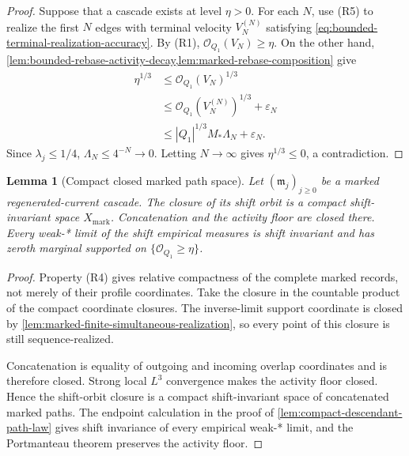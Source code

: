 \documentclass[11pt]{amsart}
\numberwithin{equation}{section}
\theoremstyle{plain}
\newtheorem{lemma}[lemma]{Lemma}
\theoremstyle{definition}
\theoremstyle{remark}
\begin{document}
\begin{proof}
Suppose that a cascade exists at level \(\eta>0\).  For each \(N\), use
\textup{(R5)} to realize the first \(N\) edges with terminal velocity
\(V_N^{(N)}\) satisfying
\eqref{eq:bounded-terminal-realization-accuracy}.
By \textup{(R1)},
\(\mathcal O_{Q_1}(V_N)\ge\eta\).  On the other hand,
\cref{lem:bounded-rebase-activity-decay,lem:marked-rebase-composition} give
\begin{align*}
 \eta^{1/3}
 &\le \mathcal O_{Q_1}(V_N)^{1/3}\\
 &\le \mathcal O_{Q_1}(V_N^{(N)})^{1/3}+\varepsilon_N\\
 &\le |Q_1|^{1/3}M_*\Lambda_N+\varepsilon_N.
\end{align*}
Since \(\lambda_j\le1/4\),
\(\Lambda_N\le4^{-N}\to0\).  Letting \(N\to\infty\) gives
\(\eta^{1/3}\le0\), a contradiction.
\end{proof}

\begin{lemma}[Compact closed marked path space]
\label{lem:compact-closed-marked-path-space}
Let \((\mathfrak m_j)_{j\ge0}\) be a marked regenerated-current cascade.
The closure of its shift orbit is a compact shift-invariant space
\(X_{\mathrm{mark}}\).  Concatenation and the activity floor are closed there.
Every weak-* limit of the shift empirical measures is shift invariant and has
zeroth marginal supported on \(\{\mathcal O_{Q_1}\ge\eta\}\).
\end{lemma}

\begin{proof}
Property \textup{(R4)} gives relative compactness of the complete marked
records, not merely of their profile coordinates.  Take the closure in the
countable product of the compact coordinate closures.  The inverse-limit
support coordinate is closed by
\cref{lem:marked-finite-simultaneous-realization}, so every point of this
closure is still sequence-realized.

Concatenation is equality of outgoing and incoming overlap coordinates and is
therefore closed.  Strong local \(L^3\) convergence makes the activity floor
closed.  Hence the shift-orbit closure is a compact shift-invariant space of
concatenated marked paths.  The endpoint calculation in the proof of
\cref{lem:compact-descendant-path-law} gives shift invariance of every
empirical weak-* limit, and the Portmanteau theorem preserves the activity
floor.
\end{proof}
\end{document}
